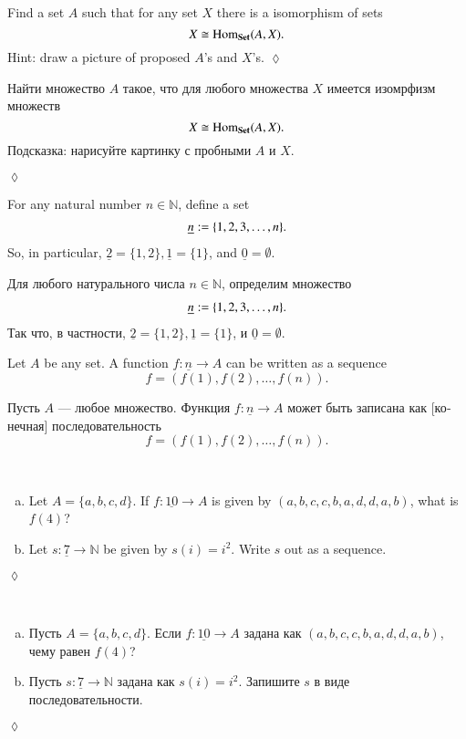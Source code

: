 \documentclass{book}
\def\tn{\textnormal}
\def\NN{{\mathbb N}}
\def\Hom{\tn{Hom}}
\def\to{\rightarrow}
\def\taking{\colon}
\def\iso{\cong}
\def\ul{\underline}
\def\Set{{\bf Set}}
\theoremstyle{theoremENG}
\theoremstyle{lemmaENG}
\theoremstyle{propositionENG}
\theoremstyle{corollaryENG}
\theoremstyle{factENG}
\theoremstyle{remarkENG}
\theoremstyle{exampleENG}
\theoremstyle{warningENG}
\theoremstyle{questionENG}
\theoremstyle{guessENG}
\theoremstyle{answerENG}
\theoremstyle{constructionENG}
\theoremstyle{rulesENG}
\theoremstyle{excENG}
\newtheorem{excENG}[subsubsection]{\begin{english}Exercise\end{english}}
\theoremstyle{appENG}
\theoremstyle{definitionENG}
\theoremstyle{notationENG}
\theoremstyle{conjectureENG}
\theoremstyle{postulateENG}
\newenvironment{exerciseENG}{\begin{excENG}}{\hspace*{\fill}$\lozenge$\end{excENG}}
\theoremstyle{theoremRUS}
\theoremstyle{lemmaRUS}
\theoremstyle{propositionRUS}
\theoremstyle{corollaryRUS}
\theoremstyle{factRUS}
\theoremstyle{remarkRUS}
\theoremstyle{exampleRUS}
\theoremstyle{warningRUS}
\theoremstyle{questionRUS}
\theoremstyle{guessRUS}
\theoremstyle{answerRUS}
\theoremstyle{constructionRUS}
\theoremstyle{rulesRUS}
\theoremstyle{excRUS}
\newtheorem{excRUS}[subsubsection]{\begin{russian}Упражнение\end{russian}}
\theoremstyle{appRUS}
\theoremstyle{definitionRUS}
\theoremstyle{notationRUS}
\theoremstyle{conjectureRUS}
\theoremstyle{postulateRUS}
\newenvironment{exerciseRUS}{\begin{excRUS}}{\hspace*{\fill}$\lozenge$\end{excRUS}}
\def\sexc{\begin{enumerate}[a.)]\setlength{\itemsep}{.1cm}\setlength{\parskip}{.1cm}\item}
\def\next{\item}
\def\endsexc{\end{enumerate}}
\begin{document}
\begin{english}
\begin{exerciseENG}\label{exc:generator for set}
Find a set $A$ such that for any set $X$ there is a isomorphism of sets $$X\iso\Hom_\Set(A,X).$$ Hint: draw a picture of proposed $A$'s and $X$'s.
\end{exerciseENG}

\begin{exerciseRUS}\label{exc:generator for set}
\begin{russian}Найти множество $A$ такое, что для любого множества $X$ имеется изомрфизм множеств $$X\iso\Hom_\Set(A,X).$$ Подсказка: нарисуйте картинку с пробными $A$ и $X$.
\end{russian}
\end{exerciseRUS}

For any natural number $n\in\NN$, define a set 
\begin{align}\label{dia:underline n}\index{a symbol!$\ul{n}$}
\ul{n}:=\{1,2,3,\ldots,n\}.
\end{align}
So, in particular, $\ul{2}=\{1,2\}, \ul{1}=\{1\}$, and $\ul{0}=\emptyset$. 

\begin{russian}
Для любого натурального числа $n\in\NN$, определим множество 
\begin{align}\label{dia:underline n}\index{a symbol!$\ul{n}$}
\ul{n}:=\{1,2,3,\ldots,n\}.
\end{align}
Так что, в частности, $\ul{2}=\{1,2\}, \ul{1}=\{1\}$, и $\ul{0}=\emptyset$. 
\end{russian}

Let $A$ be any set. A function $f\taking\ul{n}\to A$ can be written as a sequence $$f=(f(1),f(2),\ldots,f(n)).$$

\begin{russian}Пусть $A$ — любое множество. Функция $f\taking\ul{n}\to A$ может быть записана как [конечная] последовательность $$f=(f(1),f(2),\ldots,f(n)).$$\end{russian}

\begin{exerciseENG}\label{exc:sequence}~
\sexc Let $A=\{a,b,c,d\}$. If $f\taking\ul{10}\to A$ is given by $(a,b,c,c,b,a,d,d,a,b)$, what is $f(4)$?
\next Let $s\taking\ul{7}\to\NN$ be given by $s(i)=i^2$. Write $s$ out as a sequence.
\endsexc
\end{exerciseENG}

\begin{exerciseRUS}\label{exc:sequence}~
\begin{russian} 
\sexc Пусть $A=\{a,b,c,d\}$. Если $f\taking\ul{10}\to A$ задана как $(a,b,c,c,b,a,d,d,a,b)$, чему равен $f(4)$?
\next Пусть $s\taking\ul{7}\to\NN$ задана как $s(i)=i^2$. Запишите $s$ в виде последовательности.
\endsexc
\end{russian}
\end{exerciseRUS}


\end{english}
\end{document}
